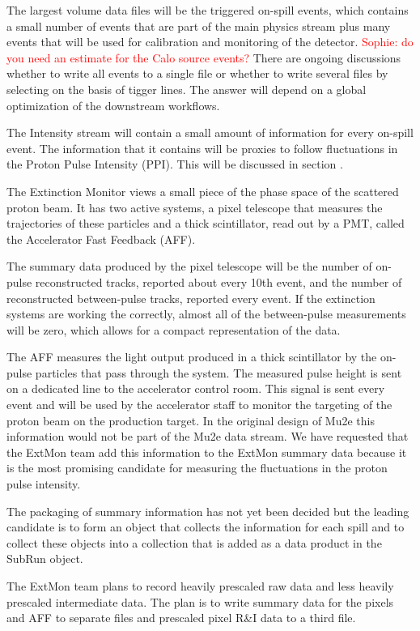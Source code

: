The largest volume data files will be the triggered on-spill events, which contains a small number of events that are part of the main physics stream plus many events that will be used for calibration and monitoring of the detector.
\textcolor{red}{Sophie: do you need an estimate for the Calo source events?}
There are ongoing discussions whether to write all events to a single file or whether to write several files by selecting on the basis of tigger lines.  The answer will depend on a global optimization of the downstream workflows.

The Intensity stream will contain a small amount of information for every on-spill event.  The information that it contains will be proxies to follow fluctuations in the Proton Pulse Intensity (PPI).  This will be discussed in section .

The Extinction Monitor views a small piece of the phase space of the scattered proton beam.  It has two active systems, a pixel telescope that measures the trajectories of these particles and a thick scintillator, read out by a PMT, called the Accelerator Fast Feedback (AFF). 

The summary data produced by the pixel telescope will be the number of on-pulse reconstructed tracks, reported about every 10th event, and the number of reconstructed between-pulse tracks, reported every event.  If the extinction systems are working the correctly, almost all of the between-pulse measurements will be zero, which allows for a compact representation of the data.

The AFF measures the light output produced in a thick scintillator by the on-pulse particles that pass through the system.  The measured pulse height is sent on a dedicated line to the accelerator control room.  This signal is sent every event and will be used by the accelerator staff to monitor the targeting of the proton beam on the production target. In the original design of Mu2e this information would not be part of the Mu2e data stream.  We have requested that the ExtMon team add this information to the ExtMon summary data because it is the most promising candidate for measuring the fluctuations in the proton pulse intensity.

The packaging of summary information has not yet been decided but the leading candidate is to form an object that collects the information for each spill and to collect these objects into a collection that is added as a data product in the \art SubRun object.

The ExtMon team plans to record heavily prescaled raw data and less heavily prescaled intermediate data. The plan is to write summary data for the pixels and AFF to separate files and prescaled pixel R\&I data to a third file.

